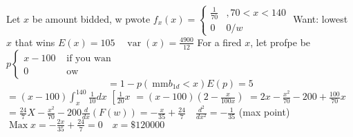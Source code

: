 Let $x$ be amount bidded, w pwote
$f_{x}(x)=\left\{\begin{array}{rl}\frac{1}{70} & , 70<x<140 \\ 0 & 0 / w\end{array}\right.$ Want: lowest $x$ that wins $E(x)=105 \quad \operatorname{var}(x)=\frac{4900}{12}$
For a fired $x$, let profpe be $p\left\{\begin{array}{cc}x-100 & \text { if you wan } \\ 0 & \text { ow }\end{array}\right.$
\[
=1-p\left(\mathrm{~mm} b_{1 d}<x\right) E(p)=5
\]
$=(x-100) \int_{x}^{140} \frac{1}{10} d x$
$\left[\frac{1}{20} x\right.$
$=(x-100)\left(2-\frac{x}{100 x}\right)$
$=2 x-\frac{x^{2}}{70}-200+\frac{100}{70} x$
$=\frac{24}{7} X-\frac{x^{2}}{70}-200 \frac{d}{d x}(F(w))=-\frac{x}{35}+\frac{24}{7} \quad \frac{d^{2}}{d x^{2}}=-\frac{1}{35}$ (max point)
$\operatorname{Max} x=-\frac{2 x}{35}+\frac{24}{7}=0 \quad x=\$ 120000$